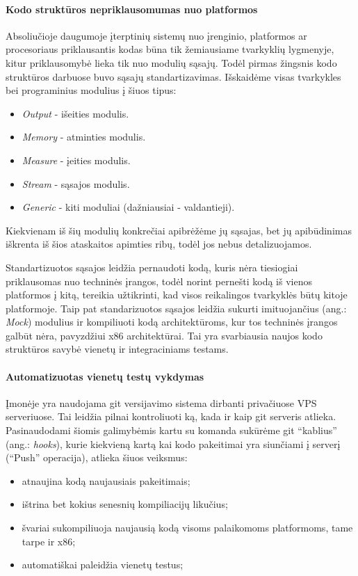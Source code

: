 \documentclass[12pt, a4paper, lithuanian, final]{article}
\begin{document}
\paragraph{Kodo struktūros nepriklausomumas nuo platformos}

Absoliučioje daugumoje įterptinių sistemų nuo įrenginio, platformos ar procesoriaus priklausantis kodas būna tik žemiausiame tvarkyklių lygmenyje, kitur priklausomybė lieka tik nuo modulių sąsajų.
Todėl pirmas žingsnis kodo struktūros darbuose buvo sąsajų standartizavimas.
Išskaidėme visas tvarkykles bei programinius modulius į šiuos tipus:
\begin{itemize}
	\item \textit{Output} - išeities modulis.
	\item \textit{Memory} - atminties modulis.
	\item \textit{Measure} - įeities modulis.
	\item \textit{Stream} - sąsajos modulis.
	\item \textit{Generic} - kiti moduliai (dažniausiai - valdantieji).
\end{itemize}

Kiekvienam iš šių modulių konkrečiai apibrėžėme jų sąsajas, bet jų apibūdinimas iškrenta iš šios ataskaitos apimties ribų, todėl jos nebus detalizuojamos.


Standartizuotos sąsajos leidžia pernaudoti kodą, kuris nėra tiesiogiai priklausomas nuo techninės įrangos, todėl norint pernešti kodą iš vienos platformos į kitą, tereikia užtikrinti, kad visos reikalingos tvarkyklės būtų kitoje platformoje.
Taip pat standarizuotos sąsajos leidžia sukurti imituojančius (ang.: \textit{Mock}) modulius ir kompiliuoti kodą architektūroms, kur tos techninės įrangos galbūt nėra, pavyzdžiui x86 architektūrai.
Tai yra svarbiausia naujos kodo struktūros savybė vienetų ir integraciniams testams.


\paragraph{Automatizuotas vienetų testų vykdymas}

Įmonėje yra naudojama git versijavimo sistema dirbanti privačiuose VPS serveriuose.
Tai leidžia pilnai kontroliuoti ką, kada ir kaip git serveris atlieka.
Pasinaudodami šiomis galimybėmis kartu su komanda sukūrėme git "`kablius"' (ang.: \textit{hooks}), kurie kiekvieną kartą kai kodo pakeitimai yra siunčiami į serverį ("`Push"' operacija), atlieka šiuos veiksmus:
\begin{itemize}
	\item atnaujina kodą naujausiais pakeitimais;
	\item ištrina bet kokius senesnių kompiliacijų likučius;
	\item švariai sukompiliuoja naujausią kodą visoms palaikomoms platformoms, tame tarpe ir x86;
	\item automatiškai paleidžia vienetų testus;
\end{itemize}
\end{document}
